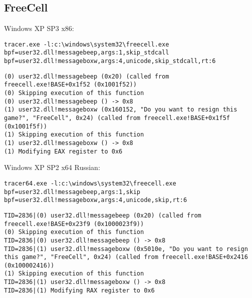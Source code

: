 \subsection{FreeCell}



 Windows XP SP3 x86:

\begin{lstlisting}
tracer.exe -l:c:\windows\system32\freecell.exe bpf=user32.dll!messagebeep,args:1,skip_stdcall bpf=user32.dll!messageboxw,args:4,unicode,skip_stdcall,rt:6
\end{lstlisting}

\begin{lstlisting}
(0) user32.dll!messagebeep (0x20) (called from freecell.exe!BASE+0x1f52 (0x1001f52))
(0) Skipping execution of this function
(0) user32.dll!messagebeep () -> 0x8
(1) user32.dll!messageboxw (0x160152, "Do you want to resign this game?", "FreeCell", 0x24) (called from freecell.exe!BASE+0x1f5f (0x1001f5f))
(1) Skipping execution of this function
(1) user32.dll!messageboxw () -> 0x8
(1) Modifying EAX register to 0x6
\end{lstlisting}

 Windows XP SP2 x64 Russian:

\begin{lstlisting}
tracer64.exe -l:c:\windows\system32\freecell.exe bpf=user32.dll!messagebeep,args:1,skip bpf=user32.dll!messageboxw,args:4,unicode,skip,rt:6
\end{lstlisting}

\begin{lstlisting}
TID=2836|(0) user32.dll!messagebeep (0x20) (called from freecell.exe!BASE+0x23f9 (0x1000023f9))
(0) Skipping execution of this function
TID=2836|(0) user32.dll!messagebeep () -> 0x8
TID=2836|(1) user32.dll!messageboxw (0x5010e, "Do you want to resign this game?", "FreeCell", 0x24) (called from freecell.exe!BASE+0x2416 (0x100002416))
(1) Skipping execution of this function
TID=2836|(1) user32.dll!messageboxw () -> 0x8
TID=2836|(1) Modifying RAX register to 0x6
\end{lstlisting}

